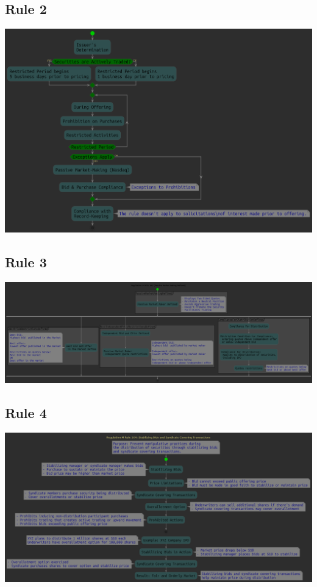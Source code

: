 \documentclass[11pt]{article}
\begin{document}
\subsection{Rule 2}
\label{sec:orgdb9332b}

\begin{center}
\includegraphics[width=.9\linewidth]{./Regulation_M_Rule_102.png}
\end{center}

\subsection{Rule 3}
\label{sec:orga34282d}

\begin{center}
\includegraphics[width=.9\linewidth]{./Regulation_M_Rule_103.png}
\end{center}

\subsection{Rule 4}
\label{sec:org22a2e84}
\begin{center}
\includegraphics[width=.9\linewidth]{./Regulation_M_Rule_104.png}
\end{center}
\end{document}
